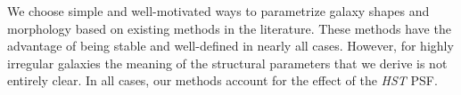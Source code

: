 \documentclass[twocolumn,useAMS,usenatbib]{mn2e}
\newcommand{\rachel}[1]{{\textcolor{red}{#1}}}
\newcommand{\arun}[1]{{\textcolor{blue}{#1}}}
\newcommand{\rmd}{\mathrm{d}}
\begin{document}
We choose simple and well-motivated ways to parametrize galaxy shapes
and morphology based on existing methods in the literature.  These
methods have the advantage of being stable and well-defined in nearly
all cases.  However, for highly irregular galaxies the meaning of the
structural parameters that we derive is not entirely clear.  In all
cases, our methods account for the effect of the {\em HST} PSF.
% 
% 
\end{document}
